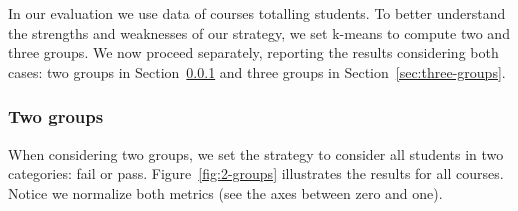 In our evaluation we use data of \semesters courses totalling \totalStudents students. To better understand the strengths and weaknesses of our strategy, we set k-means to compute two and three groups. We now proceed separately, reporting the results considering both cases: two groups in Section~\ref{sec:two-groups} and three groups in Section~\ref{sec:three-groups}.

\subsubsection{Two groups}

\label{sec:two-groups}

When considering two groups, we set the strategy to consider all students in two categories: fail or pass. Figure~\ref{fig:2-groups} illustrates the results for all courses. Notice we normalize both metrics (see the axes between zero and one).

